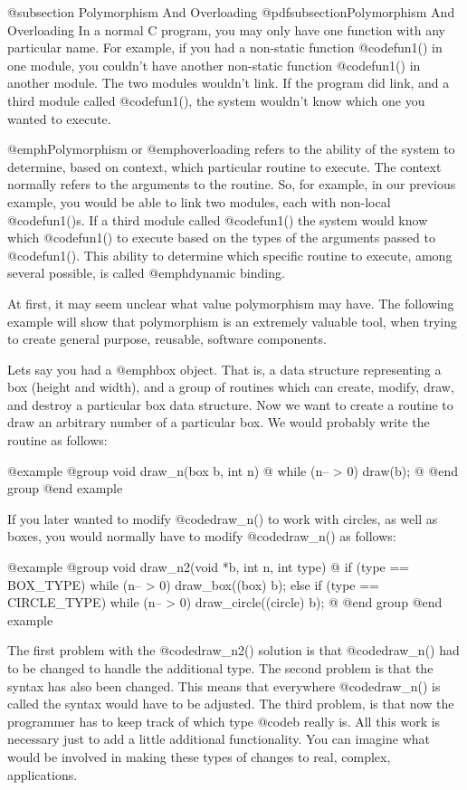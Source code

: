 @subsection Polymorphism And Overloading
@pdfsubsection{Polymorphism And Overloading}
In a normal C program, you may only have one function with any particular
name.  For example, if you had a non-static function @code{fun1()} in one
module, you couldn't have another non-static function @code{fun1()} in
another module.  The two modules wouldn't link.  If the program did
link, and a third module called @code{fun1()}, the system wouldn't know
which one you wanted to execute.

@emph{Polymorphism} or @emph{overloading} refers to the ability of the
system to determine, based on context, which particular routine to
execute.  The context normally refers to the arguments to the routine.
So, for example, in our previous example, you would be able to link two
modules, each with non-local @code{fun1()}s.  If a third module called
@code{fun1()} the system would know which @code{fun1()} to execute based
on the types of the arguments passed to @code{fun1()}.  This ability to
determine which specific routine to execute, among several possible, is
called @emph{dynamic binding}.

At first, it may seem unclear what value polymorphism may have.  The
following example will show that polymorphism is an extremely valuable
tool, when trying to create general purpose, reusable, software
components.

Lets say you had a @emph{box} object.  That is, a data structure
representing a box (height and width), and a group of routines which
can create, modify, draw, and destroy a particular box data structure.
Now we want to create a routine to draw an arbitrary number of a
particular box.  We would probably write the routine as follows:

@example
@group
void    draw_n(box b, int n)
@{
        while (n-- > 0)
                draw(b);
@}
@end group
@end example

If you later wanted to modify @code{draw_n()} to work with circles, as
well as boxes, you would normally have to modify @code{draw_n()} as follows:

@example
@group
void    draw_n2(void *b, int n, int type)
@{
        if (type == BOX_TYPE)
                while (n-- > 0)
                        draw_box((box) b);
        else if (type == CIRCLE_TYPE)
                while (n-- > 0)
                        draw_circle((circle) b);
@}
@end group
@end example

The first problem with the @code{draw_n2()} solution is that @code{draw_n()}
had to be changed to handle the additional type.  The second problem is that
the syntax has also been changed.  This means that everywhere @code{draw_n()}
is called the syntax would have to be adjusted.  The third problem, is that
now the programmer has to keep track of which type @code{b} really is.
All this work is necessary just to add a little additional functionality.
You can imagine what would be involved in making these types of changes
to real, complex, applications.

